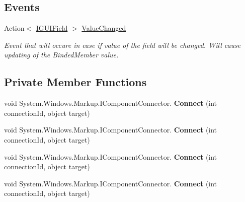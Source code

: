 \subsection*{Events}
\begin{DoxyCompactItemize}
\item 
Action$<$ \mbox{\hyperlink{interface_wpf_handler_1_1_u_i_1_1_auto_layout_1_1_i_g_u_i_field}{I\+G\+U\+I\+Field}} $>$ \mbox{\hyperlink{class_wpf_handler_1_1_u_i_1_1_controls_1_1_flat_toggles_group_aa00366c7443bee714b067ee15186de82}{Value\+Changed}}
\begin{DoxyCompactList}\small\item\em Event that will occure in case if value of the field will be changed. Will cause updating of the Binded\+Member value. \end{DoxyCompactList}\end{DoxyCompactItemize}
\subsection*{Private Member Functions}
\begin{DoxyCompactItemize}
\item 
\mbox{\label{class_wpf_handler_1_1_u_i_1_1_controls_1_1_flat_toggles_group_ac714bc342f0c8121d2adb1585696110c}} 
void System.\+Windows.\+Markup.\+I\+Component\+Connector. {\bfseries Connect} (int connection\+Id, object target)
\item 
\mbox{\label{class_wpf_handler_1_1_u_i_1_1_controls_1_1_flat_toggles_group_ac714bc342f0c8121d2adb1585696110c}} 
void System.\+Windows.\+Markup.\+I\+Component\+Connector. {\bfseries Connect} (int connection\+Id, object target)
\item 
\mbox{\label{class_wpf_handler_1_1_u_i_1_1_controls_1_1_flat_toggles_group_ac714bc342f0c8121d2adb1585696110c}} 
void System.\+Windows.\+Markup.\+I\+Component\+Connector. {\bfseries Connect} (int connection\+Id, object target)
\item 
\mbox{\label{class_wpf_handler_1_1_u_i_1_1_controls_1_1_flat_toggles_group_ac714bc342f0c8121d2adb1585696110c}} 
void System.\+Windows.\+Markup.\+I\+Component\+Connector. {\bfseries Connect} (int connection\+Id, object target)
\end{DoxyCompactItemize}
